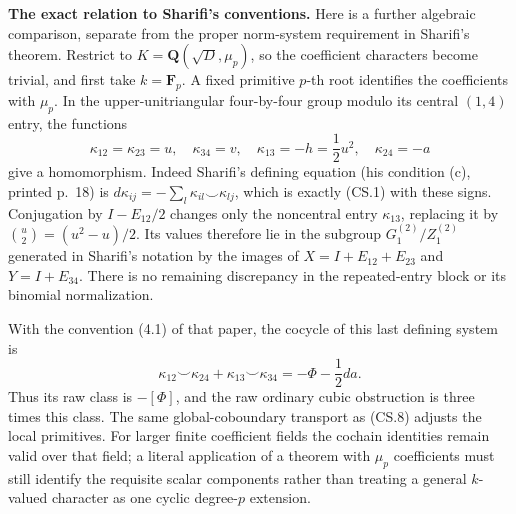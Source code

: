 \documentclass[11pt,a4paper]{article}
\theoremstyle{definition}
\renewcommand{\paragraph}[1]{\par\smallskip\noindent\textbf{#1}\quad\ignorespaces}
\begin{document}
\paragraph{The exact relation to Sharifi's conventions.}
Here is a further algebraic comparison, separate from the
proper norm-system requirement in Sharifi's theorem.
Restrict to \(K=\mathbf Q(\sqrt D,\mu_p)\), so the
coefficient characters become trivial, and first take
\(k=\mathbf F_p\).  A fixed primitive \(p\)-th root
identifies the coefficients with \(\mu_p\).
In the upper-unitriangular four-by-four group modulo its
central \((1,4)\) entry, the functions
\[
 \kappa_{12}=\kappa_{23}=u,\quad\kappa_{34}=v,\quad
 \kappa_{13}=-h=\frac12u^2,\quad\kappa_{24}=-a
                                                               \tag{CS.9}
\]
give a homomorphism.  Indeed Sharifi's defining equation
(his condition (c), printed p.~18) is
\(d\kappa_{ij}=-\sum_l\kappa_{il}\smile\kappa_{lj}\),
which is exactly (CS.1) with these signs.
Conjugation by \(I-E_{12}/2\) changes only the noncentral
entry \(\kappa_{13}\), replacing it by
\(\binom{u}{2}=(u^2-u)/2\).  Its values therefore lie
in the subgroup \(G_1^{(2)}/Z_1^{(2)}\) generated in
Sharifi's notation by the images of
\(X=I+E_{12}+E_{23}\) and \(Y=I+E_{34}\).
There is no remaining discrepancy in the repeated-entry
block or its binomial normalization.

With the convention (4.1) of that paper, the cocycle
of this last defining system is
\[
 \kappa_{12}\smile\kappa_{24}
       +\kappa_{13}\smile\kappa_{34}
       =-\Phi-\frac12d a .                              \tag{CS.10}
\]
Thus its raw class is \(-[\Phi]\), and the raw ordinary
cubic obstruction is three times this class.  The same
global-coboundary transport as (CS.8) adjusts the local
primitives.  For larger finite coefficient fields the
cochain identities remain valid over that field; a
literal application of a theorem with \(\mu_p\)
coefficients must still identify the requisite scalar
components rather than treating a general \(k\)-valued
character as one cyclic degree-\(p\) extension.
\end{document}
